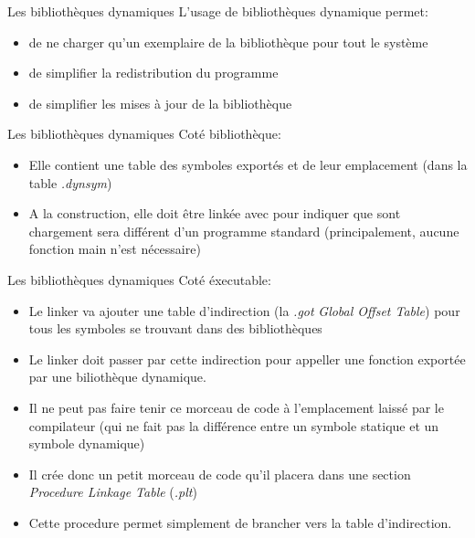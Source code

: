 \begin{frame}[fragile=singleslide]{Les bibliothèques dynamiques}
  L'usage de bibliothèques dynamique permet:
  \begin{itemize}
  \item de ne charger qu'un exemplaire de la bibliothèque pour tout le
    système
  \item de simplifier la redistribution du programme
  \item de simplifier les mises à jour de la bibliothèque
  \end{itemize}
\end{frame}

\begin{frame}[fragile=singleslide]{Les bibliothèques dynamiques}
  Coté bibliothèque:
  \begin{itemize}
  \item  Elle contient  une table  des  symboles exportés  et de  leur
    emplacement (dans la table \emph{.dynsym})
  \item A  la construction, elle  doit être linkée  avec 
    pour indiquer  que sont  chargement sera différent  d'un programme
    standard (principalement, aucune fonction main n'est nécessaire)
  \end{itemize}
\end{frame}

\begin{frame}[fragile=singleslide]{Les bibliothèques dynamiques}
  Coté éxecutable:
  \begin{itemize}
  \item Le  linker va ajouter une table  d'indirection (la \emph{.got}
    \emph{Global  Offset Table})  pour tous  les symboles  se trouvant
    dans des bibliothèques
  \item Le linker doit passer  par cette indirection pour appeller une
    fonction exportée par une biliothèque dynamique.
  \item Il ne peut pas faire  tenir ce morceau de code à l'emplacement
    laissé par le compilateur (qui  ne fait pas la différence entre un
    symbole statique et un symbole dynamique)
  \item Il crée  donc un petit morceau de code  qu'il placera dans une
    section \emph{Procedure Linkage Table} (\emph{.plt})
  \item Cette  procedure permet simplement  de brancher vers  la table
    d'indirection.
  \end{itemize}
\end{frame}

